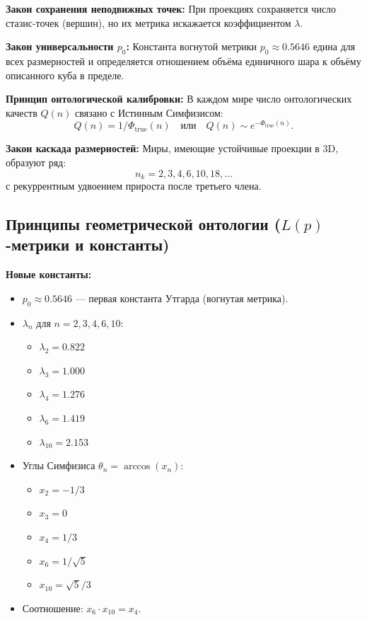 \documentclass[a4paper,12pt]{article}
\begin{document}
\textbf{Закон сохранения неподвижных точек:} При проекциях сохраняется число стазис-точек (вершин), но их метрика искажается коэффициентом $\lambda$.

\textbf{Закон универсальности $p_0$:} Константа вогнутой метрики $p_0 \approx 0.5646$ едина для всех размерностей и определяется отношением объёма единичного шара к объёму описанного куба в пределе.

\textbf{Принцип онтологической калибровки:} В каждом мире число онтологических качеств $Q(n)$ связано с Истинным Симфизисом:
\[
Q(n) = 1 / \Phi_{\text{true}}(n) \quad \text{или} \quad Q(n) \sim e^{-\Phi_{\text{true}}(n)}.
\]

\textbf{Закон каскада размерностей:} Миры, имеющие устойчивые проекции в 3D, образуют ряд:
\[
n_k = 2, 3, 4, 6, 10, 18, \dots
\]
с рекуррентным удвоением прироста после третьего члена.

\subsection{Принципы геометрической онтологии ($L(p)$-метрики и константы)}

\textbf{Новые константы:}
\begin{itemize}
	\item $p_0 \approx 0.5646$ — первая константа Утгарда (вогнутая метрика).
	\item $\lambda_n$ для $n = 2,3,4,6,10$:
	\begin{itemize}
		\item $\lambda_2 = 0.822$
		\item $\lambda_3 = 1.000$
		\item $\lambda_4 = 1.276$
		\item $\lambda_6 = 1.419$
		\item $\lambda_{10} = 2.153$
	\end{itemize}
	\item Углы Симфизиса $\theta_n = \arccos(x_n)$:
	\begin{itemize}
		\item $x_2 = -1/3$
		\item $x_3 = 0$
		\item $x_4 = 1/3$
		\item $x_6 = 1/\sqrt{5}$
		\item $x_{10} = \sqrt{5}/3$
	\end{itemize}
	\item Соотношение: $x_6 \cdot x_{10} = x_4$.
\end{itemize}
\end{document}
